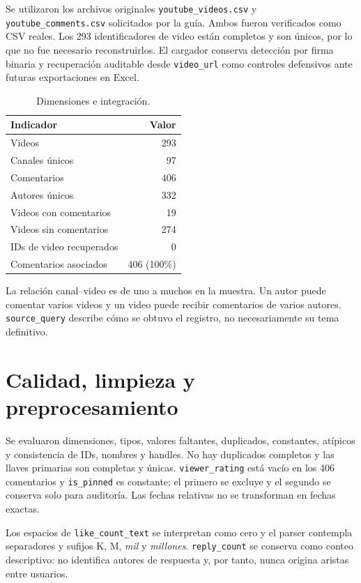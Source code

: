 \documentclass[11pt]{article}
\begin{document}
Se utilizaron los archivos originales \texttt{youtube\_videos.csv} y \texttt{youtube\_comments.csv} solicitados por la guía. Ambos fueron verificados como CSV reales. Los 293 identificadores de video están completos y son únicos, por lo que no fue necesario reconstruirlos. El cargador conserva detección por firma binaria y recuperación auditable desde \texttt{video\_url} como controles defensivos ante futuras exportaciones en Excel.

\begin{table}[H]
\centering
\caption{Dimensiones e integración.}
\begin{tabular}{lr}
\toprule
Indicador & Valor\\
\midrule
Videos & 293\\
Canales únicos & 97\\
Comentarios & 406\\
Autores únicos & 332\\
Videos con comentarios & 19\\
Videos sin comentarios & 274\\
IDs de video recuperados & 0\\
Comentarios asociados & 406 (100\%)\\
\bottomrule
\end{tabular}
\end{table}

La relación canal--video es de uno a muchos en la muestra. Un autor puede comentar varios videos y un video puede recibir comentarios de varios autores. \texttt{source\_query} describe cómo se obtuvo el registro, no necesariamente su tema definitivo.

\section{Calidad, limpieza y preprocesamiento}

Se evaluaron dimensiones, tipos, valores faltantes, duplicados, constantes, atípicos y consistencia de IDs, nombres y handles. No hay duplicados completos y las llaves primarias son completas y únicas. \texttt{viewer\_rating} está vacío en los 406 comentarios y \texttt{is\_pinned} es constante; el primero se excluye y el segundo se conserva solo para auditoría. Las fechas relativas no se transforman en fechas exactas.

Los espacios de \texttt{like\_count\_text} se interpretan como cero y el parser contempla separadores y sufijos K, M, \emph{mil} y \emph{millones}. \texttt{reply\_count} se conserva como conteo descriptivo: no identifica autores de respuesta y, por tanto, nunca origina aristas entre usuarios.
\end{document}
